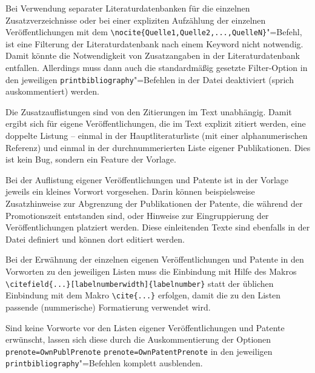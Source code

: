Bei Verwendung separater Literaturdatenbanken für die einzelnen Zusatzverzeichnisse
oder bei einer expliziten Aufzählung der einzelnen Veröffentlichungen mit dem
\lstinline|\nocite{Quelle1,Quelle2,...,QuelleN}|"=Befehl,
ist eine Filterung der Literaturdatenbank nach einem Keyword nicht notwendig.
Damit könnte die Notwendigkeit von Zusatzangaben in der Literaturdatenbank entfallen.
Allerdings muss dann auch die standardmäßig gesetzte Filter-Option in den jeweiligen
\lstinline|printbibliography|"=Befehlen
in der Datei  
deaktiviert (sprich auskommentiert) werden.

Die Zusatzauflistungen sind von den Zitierungen im Text unabhängig.
Damit ergibt sich für eigene Veröffentlichungen,
die im Text explizit zitiert werden, eine doppelte Listung --
einmal in der Hauptliteraturliste (mit einer alphanumerischen Referenz)
und einmal in der durchnummerierten Liste eigener Publikationen.
Dies ist kein Bug, sondern ein Feature der Vorlage.

Bei der Auflistung eigener Veröffentlichungen und Patente ist 
in der Vorlage jeweils ein kleines Vorwort vorgesehen.
Darin können beispielsweise Zusatzhinweise zur Abgrenzung der Publikationen \bzw
der Patente, die während der Promotionszeit entstanden sind,
oder Hinweise zur Eingruppierung der Veröffentlichungen platziert werden.
Diese einleitenden Texte sind ebenfalls in der Datei
definiert und können dort editiert werden.

Bei der Erwähnung der einzelnen eigenen Veröffentlichungen und Patente in den Vorworten 
zu den jeweiligen Listen
muss die Einbindung mit Hilfe des Makros
\lstinline|\citefield{...}[labelnumberwidth]{labelnumber}|
statt der üblichen Einbindung mit dem Makro
\lstinline|\cite{...}|
erfolgen, damit die zu den Listen passende (nummerische) Formatierung verwendet wird.

Sind keine Vorworte vor den Listen eigener Veröffentlichungen und Patente erwünscht,
lassen sich diese durch die Auskommentierung der Optionen
\lstinline|prenote=OwnPublPrenote|
\bzw
\lstinline|prenote=OwnPatentPrenote|
in den jeweiligen 
\lstinline|printbibliography|"=Befehlen komplett ausblenden.